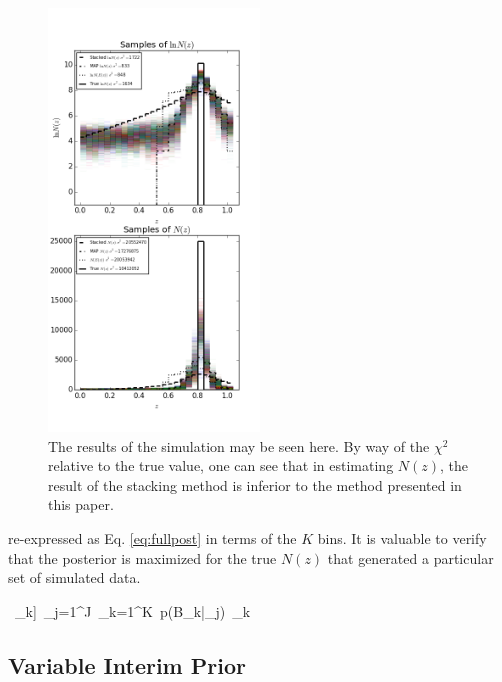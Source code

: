 \documentclass[preprint]{aastex}
\begin{document}
\begin{figure}
\includegraphics[width=0.5\textwidth]{samps-toy.png}
\caption{The results of the simulation may be seen here.  By way of the 
$\chi^{2}$ relative to the true value, one can see that in estimating $N(z)$, 
the result of the stacking method is inferior to the method presented in this 
paper.}
\label{fig:dumbestparam}
\end{figure}

re-expressed as Eq. \ref{eq:fullpost} in terms of the $K$ bins.  It is valuable 
to verify that the posterior is maximized for the true $N(z)$ that generated a 
particular set of simulated data.

\ 
\exp\left[-\sum_{k=1}^{K}\exp[\theta_{k}]\Delta_{k}\right]\ \prod_{j=1}^{J}\ 
\sum_{k=1}^{K}\ p(B_{k}|_{j})\ 
\frac{\exp[\theta_{k}]}{\exp[\theta_{k}^{0}]}\Delta_{k}

\clearpage
\subsection{Variable Interim Prior}
\label{sec:interim}
\end{document}
